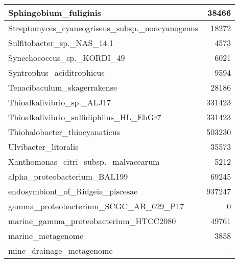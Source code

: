 \documentclass[12pt,a4paper]{article}
\begin{document}
\begin{table}[ht]
\begin{center}
\begin{tabular}{|l*{1}{|r}|}
Sphingobium\_fuliginis & 38466 \\ \hline
Streptomyces\_cyaneogriseus\_subsp.\_noncyanogenus & 18272 \\ \hline
Sulfitobacter\_sp.\_NAS\_14.1 & 4573 \\ \hline
Synechococcus\_sp.\_KORDI\_49 & 6021 \\ \hline
Syntrophus\_aciditrophicus & 9594 \\ \hline
Tenacibaculum\_skagerrakense & 28186 \\ \hline
Thioalkalivibrio\_sp.\_ALJ17 & 331423 \\ \hline
Thioalkalivibrio\_sulfidiphilus\_HL\_EbGr7 & 331423 \\ \hline
Thiohalobacter\_thiocyanaticus & 503230 \\ \hline
Ulvibacter\_litoralis & 35573 \\ \hline
Xanthomonas\_citri\_subsp.\_malvacearum & 5212 \\ \hline
alpha\_proteobacterium\_BAL199 & 69245 \\ \hline
endosymbiont\_of\_Ridgeia\_piscesae & 937247 \\ \hline
gamma\_proteobacterium\_SCGC\_AB\_629\_P17 & 0 \\ \hline
marine\_gamma\_proteobacterium\_HTCC2080 & 49761 \\ \hline
marine\_metagenome & 3858 \\ \hline
mine\_drainage\_metagenome & - \\ \hline
\end{tabular}
\end{center}
\end{table}
\end{document}
